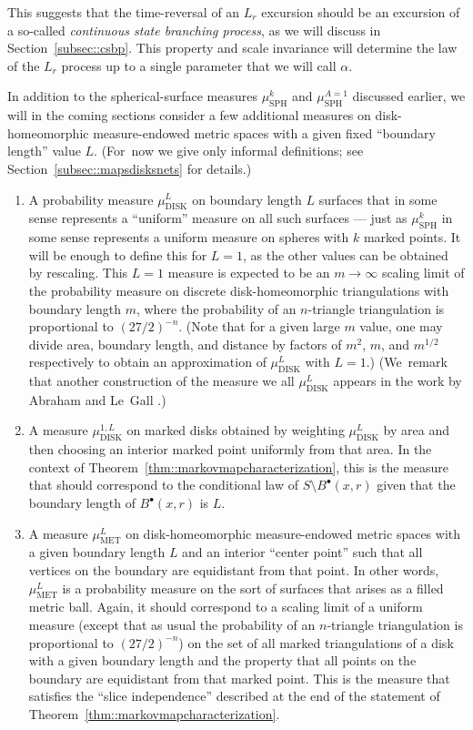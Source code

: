 \documentclass[JEP,XML,SOM,Unicode]{cedram}
\newcommand{\sbullet}{{\scriptscriptstyle\bullet}}
\theoremstyle{plain}
\numberwithin{theorem}{section}
\theoremstyle{definition}
\newcommand{\musk}{\mu_{\mathrm{SPH}}^k}
\newcommand{\musa}{{\mu_{\mathrm{SPH}}^{A=1}}}
\newcommand{\mudonel}{\mu_{ \mathrm{DISK}}^{1, L}}
\newcommand{\mudl}{\mu_{\mathrm{DISK}}^L}
\newcommand{\muml}{\mu_{\mathrm{MET}}^L}
\newcommand{\fb}[2]{B^\sbullet(#1,#2)}
\begin{document}
This suggests that the time-reversal of an $L_r$ excursion should be an excursion of a so-called \emph{continuous state branching process}, as we will discuss in Section~\ref{subsec::csbp}. This property and scale invariance will determine the law of the $L_r$ process up to a single parameter that we will call $\alpha$.

\vfill
\pagebreak[2]
In addition to the spherical-surface measures $\musk$ and $\musa$ discussed earlier, we will in the coming sections consider a few additional measures on disk-homeomorphic measure-endowed metric spaces with a given fixed ``boundary length'' value $L$. (For~now we give only informal definitions; see Section~\ref{subsec::mapsdisksnets} for details.)\enlargethispage{.5\baselineskip}%
\begin{enumerate}
\item A probability measure $\mudl$ on boundary length $L$ surfaces that in some sense represents a ``uniform'' measure on all such surfaces --- just as $\musk$ in some sense represents a uniform measure on spheres with $k$ marked points. It will be enough to define this for $L=1$, as the other values can be obtained by rescaling.
This $L=1$ measure is expected to be an $m \to \infty$ scaling limit of the probability measure on discrete disk-homeomorphic triangulations with boundary length $m$, where the probability of an $n$-triangle triangulation is proportional to $(27/2)^{-n}$. (Note that for a given large $m$ value, one may divide area, boundary length, and distance by factors of $m^2$, $m$, and $m^{1/2}$ respectively to obtain an approximation of $\mudl$ with $L=1$.) (We~remark that another construction of the measure we all $\mudl$ appears in the work by Abraham and Le~Gall \cite{alg}.)
\item A measure $\mudonel$ on marked disks obtained by weighting $\mudl$ by area and then choosing an interior marked point uniformly from that area. In the context of Theorem~\ref{thm::markovmapcharacterization}, this is the measure that should correspond to the conditional law of $S\setminus \fb{x}{r}$ given that the boundary length of $\fb{x}{r}$ is $L$.
\item A measure $\muml$ on disk-homeomorphic measure-endowed metric spaces with a given boundary length $L$ and an interior ``center point'' such that all vertices on the boundary are equidistant from that point. In other words, $\muml$ is a probability measure on the sort of surfaces that arises as a filled metric ball. Again, it should correspond to a scaling limit of a uniform measure (except that as usual the probability of an $n$-triangle triangulation is proportional to $(27/2)^{-n}$) on the set of all marked triangulations of a disk with a given boundary length and the property that all points on the boundary are equidistant from that marked point. This is the measure that satisfies the ``slice independence'' described at the end of the statement of Theorem~\ref{thm::markovmapcharacterization}.
\end{enumerate}
\end{document}
